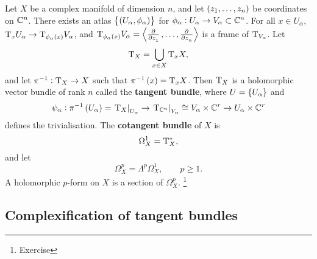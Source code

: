 \pagebreak

\begin{example}
Let $ X $ be a complex manifold of dimension $ n $, and let $ \br{z_1, \dots, z_n} $ be coordinates on $ \mathbb{C}^n $. There exists an atlas $ \cbr{\br{U_\alpha, \phi_\alpha}} $ for $ \phi_\alpha : U_\alpha \to V_\alpha \subset \mathbb{C}^n $. For all $ x \in U_\alpha $, $ \T_xU_\alpha \to \T_{\phi_\alpha\br{x}}V_\alpha $, and $ \T_{\phi_\alpha\br{x}}V_\alpha = \abr{\tpd{}{z_1}, \dots, \tpd{}{z_n}} $ is a frame of $ \mathrm{T}_{V_\alpha} $. Let
$$ \mathrm{T}_X = \bigcup_{x \in X} \mathrm{T}_xX, $$
and let $ \pi^{-1} : \mathrm{T}_X \to X $ such that $ \pi^{-1}\br{x} = \T_xX $. Then $ \mathrm{T}_X $ is a holomorphic vector bundle of rank $ n $ called the \textbf{tangent bundle}, where $ U = \cbr{U_\alpha} $ and
$$ \psi_\alpha : \pi^{-1}\br{U_\alpha} = \eval{\T_X}_{U_\alpha} \to \eval{\T_{\CC^n}}_{V_\alpha} \cong V_\alpha \times \CC^r \to U_\alpha \times \CC^r $$
defines the trivialisation. The \textbf{cotangent bundle} of $ X $ is
$$ \Omega_X^1 = \mathrm{T}_X^*, $$
and let
$$ \Omega_X^p = \Lambda^p\Omega_X^1, \qquad p \ge 1. $$
A holomorphic $ p $-form on $ X $ is a section of $ \Omega_X^p $. \footnote{Exercise}
\end{example}

\subsection{Complexification of tangent bundles}


